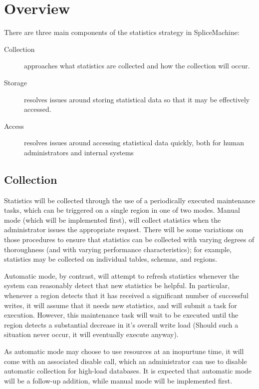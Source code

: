 \section{Overview}
\label{sec:Overview}
There are three main components of the statistics strategy in SpliceMachine:

\begin{description}
\item[Collection] approaches what statistics are collected and how the collection will occur.
\item[Storage] resolves issues around storing statistical data so that it may be effectively accessed.
\item[Access] resolves issues around accessing statistical data quickly, both for human administrators and internal systems
\end{description}

\subsection{Collection}
Statistics will be collected through the use of a periodically executed maintenance tasks, which can be triggered on a single region in one of two modes. Manual mode (which will be implemented first), will collect statistics when the administrator issues the appropriate request. There will be some variations on those procedures to ensure that statistics can be collected with varying degrees of thoroughness (and with varying performance characteristics); for example, statistics may be collected on individual tables, schemas, and regions.

Automatic mode, by contrast, will attempt to refresh statistics whenever the system can reasonably detect that new statistics be helpful. In particular, whenever a region detects that it has received a significant number of successful writes, it will assume that it needs new statistics, and will submit a task for execution. However, this maintenance task will wait to be executed until the region detects a substantial decrease in it's overall write load (Should such a situation never occur, it will eventually execute anyway).

As automatic mode may choose to use resources at an inopurtune time, it will come with an associated disable call, which an administrator can use to disable automatic collection for high-load databases. It is expected that automatic mode will be a follow-up addition, while manual mode will be implemented first.

